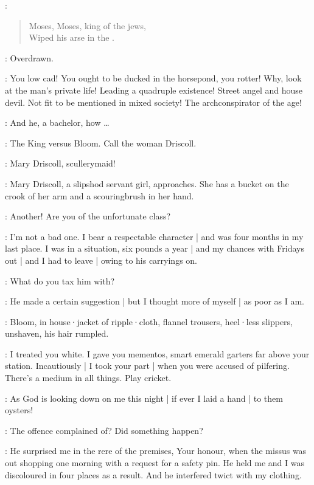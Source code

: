 \GalleryVoice:
\begin{verse}
    Moses, Moses, king of the jews,\\
    Wiped his arse in the .
\end{verse}

\Bloom:
Overdrawn.

\Beaufoy:
You low cad!
You ought to be ducked in the horsepond,
you rotter!
Why,
look at the man's private life!
Leading a quadruple existence!
Street angel and house devil.
Not fit to be mentioned in mixed society!
The archconspirator of the age!

\Bloom:
And he,
a bachelor,
how \ldots

\FirstWatch:
The King versus Bloom.
Call the woman Driscoll.

\Crier:
Mary Driscoll,
scullerymaid!

:
Mary Driscoll,
a slipshod servant girl,
approaches.
She has a bucket on the crook of her arm and a scouringbrush in her hand.

\SecondWatch:
Another!
Are you of the unfortunate class?

\Driscoll[1]:
I'm not a bad one.
I bear a respectable character |
and was four months in my last place.
I was in a situation,
six pounds a year |
and my chances with Fridays out |
and I had to leave |
owing to his carryings on.

\FirstWatch:
What do you tax him with?

\Driscoll:
He made a certain suggestion |
but I thought more of myself |
as poor as I am.

:
Bloom,
in house·jacket of ripple·cloth,
flannel trousers,
heel·less slippers,
unshaven,
his hair rumpled.

\Bloom:
I treated you white.
I gave you mementos,
smart emerald garters far above your station.
Incautiously |
I took your part |
when you were accused of pilfering.
There's a medium in all things.
Play cricket.

\Driscoll:
As God is looking down on me this night |
if ever I laid a hand |
to them oysters!

\FirstWatch:
The offence complained of?
Did something happen?

\Driscoll:
He surprised me in the rere of the premises,
Your honour,
when the missus was out shopping one morning with a request for a safety pin.
He held me and I was discoloured in four places as a result.
And he interfered twict with my clothing.

